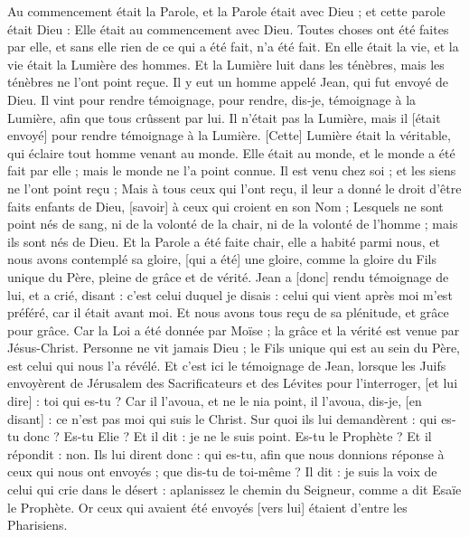 \BFont
\begin{multicols}{2}
\VerseOne{}Au commencement était la Parole, et la Parole était avec Dieu ; et cette parole était Dieu :
Elle était au commencement avec Dieu.
Toutes choses ont été faites par elle, et sans elle rien de ce qui a été fait, n'a été fait.
En elle était la vie, et la vie était la Lumière des hommes.
Et la Lumière luit dans les ténèbres, mais les ténèbres ne l'ont point reçue.
Il y eut un homme appelé Jean, qui fut envoyé de Dieu.
Il vint pour rendre témoignage, pour rendre, dis-je, témoignage à la Lumière, afin que tous crûssent par lui.
Il n'était pas la Lumière, mais il [était envoyé] pour rendre témoignage à la Lumière.
[Cette] Lumière était la véritable, qui éclaire tout homme venant au monde.
Elle était au monde, et le monde a été fait par elle ; mais le monde ne l'a point connue.
Il est venu chez soi ; et les siens ne l'ont point reçu ;
Mais à tous ceux qui l'ont reçu, il leur a donné le droit d'être faits enfants de Dieu, [savoir] à ceux qui croient en son Nom ;
Lesquels ne sont point nés de sang, ni de la volonté de la chair, ni de la volonté de l'homme ; mais ils sont nés de Dieu.
Et la Parole a été faite chair, elle a habité parmi nous, et nous avons contemplé sa gloire, [qui a été] une gloire, comme la gloire du Fils unique du Père, pleine de grâce et de vérité.
Jean a [donc] rendu témoignage de lui, et a crié, disant : c'est celui duquel je disais : celui qui vient après moi m'est préféré, car il était avant moi.
Et nous avons tous reçu de sa plénitude, et grâce pour grâce.
Car la Loi a été donnée par Moïse ; la grâce et la vérité est venue par Jésus-Christ.
Personne ne vit jamais Dieu ; le Fils unique qui est au sein du Père, est celui qui nous l'a révélé.
Et c'est ici le témoignage de Jean, lorsque les Juifs envoyèrent de Jérusalem des Sacrificateurs et des Lévites pour l'interroger, [et lui dire] : toi qui es-tu ?
Car il l'avoua, et ne le nia point, il l'avoua, dis-je, [en disant] : ce n'est pas moi qui suis le Christ.
Sur quoi ils lui demandèrent : qui es-tu donc ? Es-tu Elie ? Et il dit : je ne le suis point. Es-tu le Prophète ? Et il répondit : non.
Ils lui dirent donc : qui es-tu, afin que nous donnions réponse à ceux qui nous ont envoyés ; que dis-tu de toi-même ?
Il dit : je suis la voix de celui qui crie dans le désert : aplanissez le chemin du Seigneur, comme a dit Esaïe le Prophète.
Or ceux qui avaient été envoyés [vers lui] étaient d'entre les Pharisiens.

\end{multicols}
